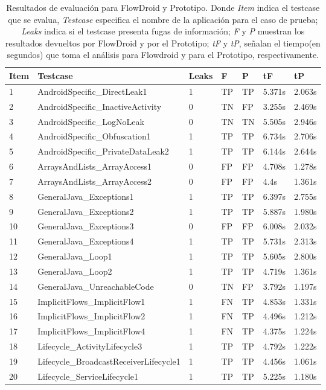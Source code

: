 \begin{table}[H]
\begin{center}
\small\addtolength{\tabcolsep}{-3pt}
\begin{tabular}{|p{1cm}|p{6cm}|p{1cm}|p{1cm}|p{1cm}|p{1cm}|p{1cm}|}
	\hline
	\textbf{Item} & \textbf{Testcase} & \textbf{Leaks} & \textbf{F} &
	\textbf{P} & \textbf{ tF} & 
	\textbf{tP}\\
	\hline
	1 & AndroidSpecific\_DirectLeak1 & 1 & TP & TP &5.371s &2.063s\\
	\hline
	2 & AndroidSpecific\_InactiveActivity & 0 & TN & FP  &3.255s &2.469s\\
	\hline
	3 & AndroidSpecific\_LogNoLeak & 0 & TN & TN &5.505s &2.946s\\
	\hline
	4 & AndroidSpecific\_Obfuscation1 & 1 & TP & TP &6.734s &2.706s\\
	\hline
	5 & AndroidSpecific\_PrivateDataLeak2 & 1 & TP & TP & 6.144s &2.644s\\
	\hline
	6 & ArraysAndLists\_ArrayAccess1 & 0 & FP & FP & 4.708s & 1.278s\\
	\hline
	7 & ArraysAndLists\_ArrayAccess2 & 0 & FP & FP & 4.4s &1.361s\\
	 \hline
	8 & GeneralJava\_Exceptions1 & 1 & TP & TP &6.397s &2.755s\\
	\hline
	9 &  GeneralJava\_Exceptions2 & 1 & TP & TP &5.887s &1.980s\\
	\hline
	10 & GeneralJava\_Exceptions3 & 0 & FP & FP &6.008s &2.032s\\
	\hline
	11 & GeneralJava\_Exceptions4 & 1 & TP & TP &5.731s &2.313s\\
	\hline
	12 & GeneralJava\_Loop1 & 1 & TP & TP &5.605s &2.800s\\
	\hline
	13 & GeneralJava\_Loop2 & 1 & TP & TP &4.719s &1.361s\\
	\hline
	14 & GeneralJava\_UnreachableCode & 0 & TN & FP &3.792s &1.197s\\
	\hline
	15 & ImplicitFlows\_ImplicitFlow1 & 1 & FN & TP &4.853s &1.331s\\
	\hline
	16 & ImplicitFlows\_ImplicitFlow2 & 1 & FN & TP &4.496s &1.212s\\
	\hline
	17 & ImplicitFlows\_ImplicitFlow4 & 1 & FN & TP &4.375s &1.224s\\
	\hline
	18 & Lifecycle\_ActivityLifecycle3 & 1 & TP & TP &4.792s &1.222s\\
	\hline
	19 & Lifecycle\_BroadcastReceiverLifecycle1 & 1 & TP & TP &4.456s &1.061s\\
	\hline
	20 & Lifecycle\_ServiceLifecycle1 & 1 & TP & TP &5.225s &1.180s\\
	\hline
\end{tabular}
\end{center}
\caption{Resultados de evaluación para FlowDroid y Prototipo. Donde
\textit{Item} indica el testcase que se evalua, \textit{Testcase} especifica el
nombre de la aplicación para el caso de prueba; \textit{Leaks} indica si el
testcase presenta fugas de información; \textit{F} y  \textit{P} muestran los resultados devueltos por FlowDroid y por
el Prototipo; \textit{tF} y \textit{tP}, señalan el tiempo(en segundos) que toma
el análisis para Flowdroid y para el Prototipo, respectivamente.}
\label{tb:resultados}
\end{table}
